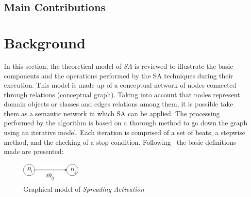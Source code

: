 \documentclass{llncs}
\begin{document}
\subsection{Main Contributions}
\section{Background}
In this section, the theoretical model of \textit{SA} is reviewed to illustrate the basic components and
the operations performed by the SA techniques during their execution. This model is made up of 
a conceptual network of nodes connected through relations (conceptual graph). 
Taking into account that nodes represent domain objects or classes and edges relations among them, 
it is possible take them as a semantic network in which SA can be applied. 
The processing performed by the algorithm is based on a thorough method to go down the graph using an iterative model. 
Each iteration is comprised of a set of beats, a stepwise method, and the checking of a stop
condition. Following~\cite{SpreadingActivationIR} the basic definitions made are presented:

\begin{figure}[h]
 \centering
    \includegraphics[width=3cm]{images/spreading}
    \caption{Graphical model of \textit{Spreading Activation}}
 \label{fig:spreading}
\end{figure}
\end{document}
